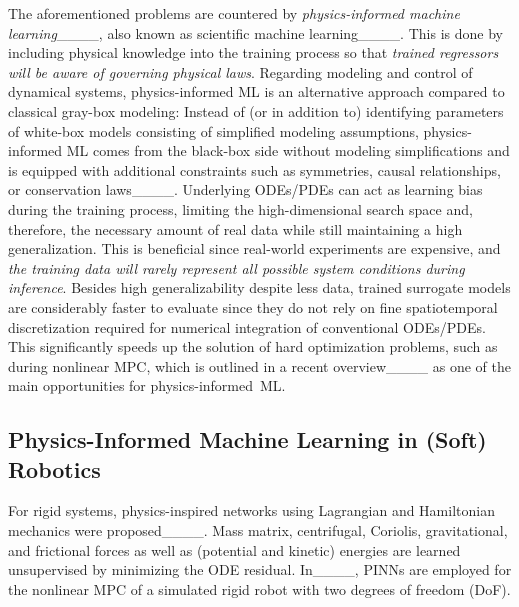 The aforementioned problems are countered by \textit{physics-informed machine learning}____, also known as scientific machine learning____. 
This is done by including physical knowledge into the training process so that \textit{trained regressors will be aware of governing physical laws}. %
Regarding modeling and control of dynamical systems, physics-informed ML is an alternative approach compared to classical gray-box modeling: 
Instead of (or in addition to) identifying parameters of white-box models consisting of simplified modeling assumptions, physics-informed ML comes from the black-box side without modeling simplifications and is equipped with additional constraints such as symmetries, causal relationships, or conservation laws____.
Underlying ODEs/PDEs can act as learning bias during the training process, limiting the high-dimensional search space and, therefore, the necessary amount of real data while still maintaining a high generalization. 
This is beneficial since real-world experiments are expensive, and \textit{the training data will rarely represent all possible system conditions during inference}.
Besides high generalizability despite less data, trained surrogate models are considerably faster to evaluate since they do not rely on fine spatiotemporal discretization required for numerical integration of conventional ODEs/PDEs. 
This significantly speeds up the solution of hard optimization problems, such as during nonlinear MPC, which is outlined in a recent overview____ as one of the main opportunities for physics-informed~ML.

\subsection{Physics-Informed Machine Learning in (Soft) Robotics}
For rigid systems, physics-inspired networks using Lagrangian and Hamiltonian mechanics were proposed____. 
Mass matrix, centrifugal, Coriolis, gravitational, and frictional forces as well as (potential and kinetic) energies are learned unsupervised by minimizing the ODE residual. 
In____, PINNs are employed for the nonlinear MPC of a simulated rigid robot with two degrees of freedom (DoF).


